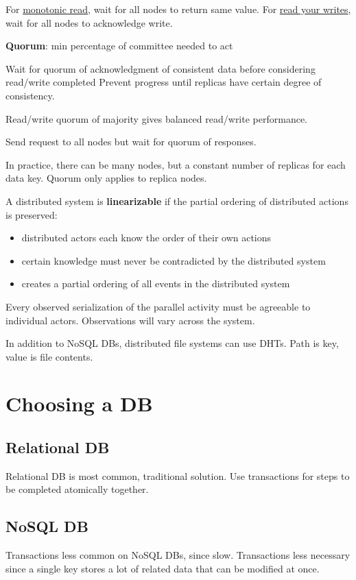 \documentclass[11pt]{article}
\begin{document}
For \uline{monotonic read}, wait for all nodes to return same value.
For \uline{read your writes}, wait for all nodes to acknowledge write.

\textbf{Quorum}: min percentage of committee needed to act

Wait for quorum of acknowledgment of consistent data before considering read/write completed
Prevent progress until replicas have certain degree of consistency.

Read/write quorum of majority gives balanced read/write performance.

Send request to all nodes but wait for quorum of responses.

In practice, there can be many nodes, but a constant number of replicas for each data key.
Quorum only applies to replica nodes.

A distributed system is \textbf{linearizable} if the partial ordering of distributed actions is preserved:
\begin{itemize}
\item distributed actors each know the order of their own actions
\item certain knowledge must never be contradicted by the distributed system
\item creates a partial ordering of all events in the distributed system
\end{itemize}

Every observed serialization of the parallel activity must be agreeable to individual actors.
Observations will vary across the system.

In addition to NoSQL DBs, distributed file systems can use DHTs.
Path is key, value is file contents.
\section{Choosing a DB}
\label{sec:orgb47a85f}
\subsection{Relational DB}
\label{sec:org2af33b0}
Relational DB is most common, traditional solution.
Use transactions for steps to be completed atomically together.
\subsection{NoSQL DB}
\label{sec:org16ea52f}
Transactions less common on NoSQL DBs, since slow.
Transactions less necessary since a single key stores a lot of related data that can be modified at once.
\end{document}
